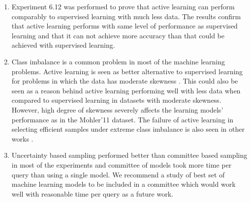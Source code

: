 \begin{enumerate}
	\item Experiment 6.12 was performed to prove that active learning can perform comparably to supervised learning with much less data. The results confirm that active learning performs with same level of performance as supervised learning and that it can not achieve more accuracy than that could be achieved with supervised learning. 
%	
	
	\item Class imbalance is a common problem in most of the machine learning problems. Active learning is seen as better alternative to supervised learning for problems in which the data has moderate skewness \cite{ertekin2007active}. This could also be seen as a reason behind active learning performing well with less data when compared to supervised learning in datasets with moderate skewness. However, high degree of skewness severely affects the learning models' performance as in the Mohler'11 dataset. The failure of active learning in selecting efficient samples under extreme class imbalance is also seen in other works \cite{attenberg2013class}. 
	
	\item Uncertainty based sampling performed better than committee based sampling in most of the experiments and committee of models took more time per query than using a single model. We recommend a study of best set of machine learning models to be included in a committee which would work well with reasonable time per query as a future work.
\end{enumerate}


